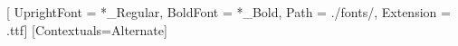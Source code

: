 \usepackage{fontspec}

\newfontfamily{}[
	UprightFont = *_Regular,
	BoldFont = *_Bold,
	Path = ./fonts/,
	Extension = .ttf]
\newfontface{}
\newfontface{}
\setmonofont{JuliaMono-Medium}[Contextuals=Alternate]

